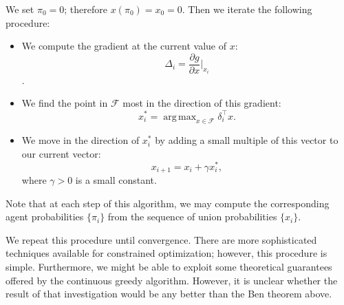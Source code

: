 \documentclass{article}
\newcommand{\cm}[1]{\mathcal{#1}}
\newcommand{\trans}{^{\top}}
\DeclareMathOperator*{\argmax}{arg\,max}
\begin{document}
We set $\pi_0 = 0$; therefore $x(\pi_0) = x_0 = 0$.  Then we iterate
the following procedure:
\begin{itemize}
\item
  We compute the gradient at the current value of $x$:
  \[\Delta_i = \frac{\partial g}{\partial x}\Biggr\rvert_{x_i}\].
\item
  We find the point in $\cm{F}$ most in the direction of this gradient:
  \[
    x^\ast_i = \argmax_{x \in \cm{F}} \delta_i\trans x.
  \]
\item
  We move in the direction of $x^\ast_i$ by adding a small multiple of
  this vector to our current vector:
  \[
    x_{i + 1} = x_i + \gamma x^\ast_i,
  \]
  where $\gamma > 0$ is a small constant.
\end{itemize}
Note that at each step of this algorithm, we may compute the
corresponding agent probabilities $\{\pi_i\}$ from the sequence of union
probabilities $\{x_i\}$.

We repeat this procedure until convergence.  There are more
sophisticated techniques available for constrained optimization;
however, this procedure is simple.  Furthermore, we might be able to
exploit some theoretical guarantees offered by the continuous greedy
algorithm.  However, it is unclear whether the result of that
investigation would be any better than the Ben theorem above.
\end{document}
